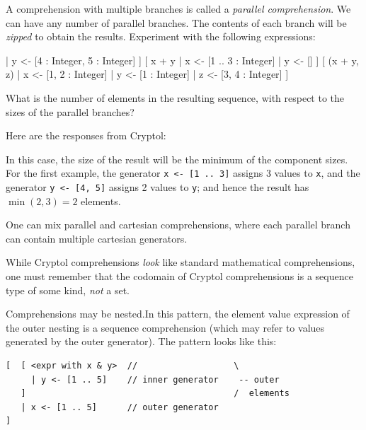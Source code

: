 \restartrepl
\begin{Exercise}\label{ex:seq:5}\indParallel\indComp
  A comprehension with multiple branches is called a \emph{parallel
    comprehension}. We can have any number of parallel branches. The
  contents of each branch will be \emph{zipped} to obtain the results.
  Experiment with the following expressions:
\begin{replinVerb}
   [ (x, y) | x <- [1 .. 3 : Integer] | y <- [4 : Integer, 5 : Integer] ]
   [ x + y  | x <- [1 .. 3 : Integer] | y <- [] ]
   [ (x + y, z)  | x <- [1, 2 : Integer] | y <- [1 : Integer] | z <- [3, 4 : Integer] ]
\end{replinVerb}
What is the number of elements in the resulting sequence, with respect
to the sizes of the parallel branches?
\end{Exercise}
\begin{Answer}
Here are the responses from Cryptol:
\begin{reploutVerb}
  [(1, 4), (2, 5)]
  []
  [(2, 3)]
\end{reploutVerb}
In this case, the size of the result will be the minimum of the
component sizes. For the first example, the generator
\texttt{x <- [1 ..\ 3]} assigns 3 values to \texttt{x}, and the generator
\texttt{y <- [4, 5]} assigns 2 values to \texttt{y}; and hence the result has
$\min(2,3) = 2$ elements.
\end{Answer}

\begin{tip}
  One can mix parallel and cartesian comprehensions, where each
  parallel branch can contain multiple cartesian
  generators.\indComp\indCartesian\indParallel
\end{tip}

\begin{tip}
  While Cryptol comprehensions \emph{look} like standard mathematical
  comprehensions, one must remember that the codomain of Cryptol
  comprehensions is a sequence type of some kind, \emph{not} a set.
\end{tip}

Comprehensions may be nested.\indNestedComp In this pattern, the
element value expression of the outer nesting is a sequence
comprehension (which may refer to values generated by the outer
generator). The pattern looks like this:

\begin{minipage}{\textwidth}  %
\begin{Verbatim}
[  [ <expr with x & y>  //                   \
     | y <- [1 .. 5]    // inner generator    -- outer
   ]                                         /  elements
   | x <- [1 .. 5]      // outer generator
]
\end{Verbatim}
\end{minipage}

